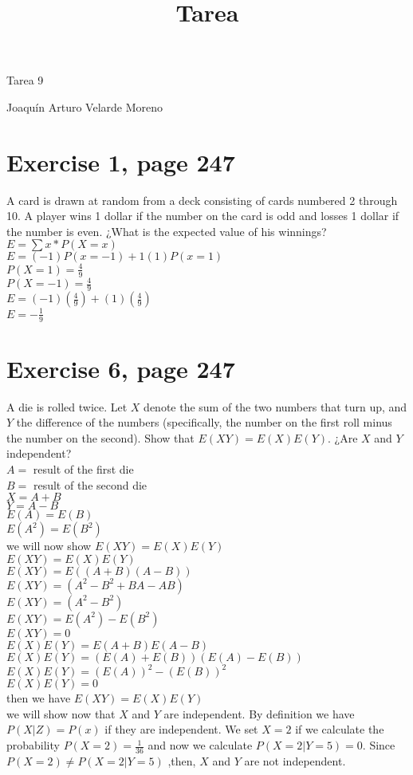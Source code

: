 \documentclass[]{article}
\title{Tarea}
\date{}
\begin{document}
\begin{center}


\centerline{Tarea 9}

\centerline{Joaquín Arturo Velarde Moreno}


\end{center}
	

\section{Exercise 1, page 247}
A card is drawn at random from a deck consisting of cards numbered 2 through 10. A player wins 1 dollar if the number on the card is odd and losses 1 dollar if the number is even. ¿What is the expected value of his winnings?\\
$E = \sum x *P(X=x)$ \\
$E = (-1)P(x=-1) + 1(1)P(x=1)$\\
$P(X=1) = \frac{4}{9}$ \\
$P(X=-1) = \frac{4}{9}$ \\
$E = (-1)(\frac{4}{9}) +(1)(\frac{4}{9})$ \\
$E = -\frac{1}{9}$ \\
\section{Exercise 6, page 247}
A die is rolled twice. Let $X$ denote the sum of the two numbers that turn up, and $Y$ the difference of the numbers (specifically, the number on the first roll minus the number on the second). Show that $E(XY) = E(X)E(Y)$. ¿Are $X$ and $Y$ independent?\\
$A =$ result of the first die \\
$B =$ result of the second die \\
$X = A + B$ \\
$Y = A - B$ \\
$E(A) = E(B)$\\
$E(A^{2}) = E(B^{2})$\\
we will now show $E(XY) = E(X)E(Y)$\\
$E(XY) = E(X)E(Y)$ \\
$E(XY) = E((A+B)(A-B))$ \\
$E(XY) = (A^{2} - B^{2}+ BA -AB)$ \\
$E(XY) = (A^{2} - B^{2})$ \\
$E(XY) = E(A^{2}) - E(B^{2})$ \\
$E(XY) = 0$ \\
$E(X)E(Y) = E(A+B)E(A-B)$\\
$E(X)E(Y) = (E(A)+E(B))(E(A)-E(B))$\\
$E(X)E(Y) = (E(A))^{2}-(E(B))^{2}$\\
$E(X)E(Y) = 0$\\
then we have $E(XY) = E(X)E(Y)$\\
we will show now that $X$ and $Y$ are independent.
By definition we have $P(X|Z)= P(x)$ if they are independent.
We set $X = 2$ if we calculate the probability $P(X = 2) = \frac{1}{36} $ and now we calculate $P(X = 2|Y=5) = 0$.
Since $P(X = 2) \neq P(X = 2|Y=5)$ ,then, $X$ and $Y$ are not independent.
\end{document}
